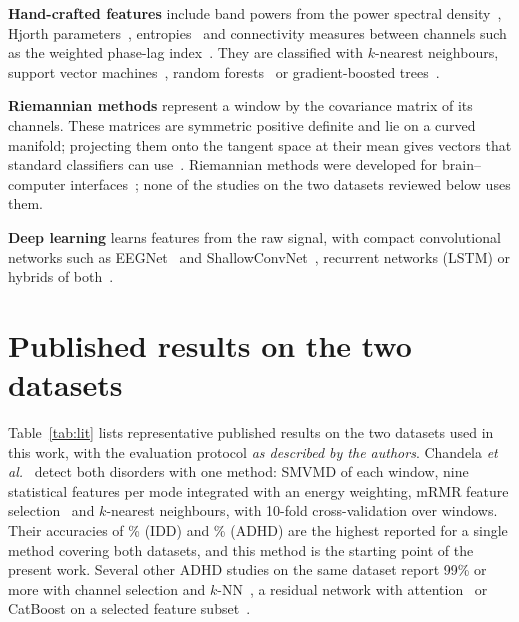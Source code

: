 \textbf{Hand-crafted features} include band powers from the power spectral
density~\cite{welch1967}, Hjorth parameters~\cite{hjorth1970}, entropies~\cite{richman2000,
bandt2002} and connectivity measures between channels such as the weighted phase-lag
index~\cite{vinck2011}. They are classified with $k$-nearest neighbours, support vector
machines~\cite{cortes1995}, random forests~\cite{breiman2001} or gradient-boosted
trees~\cite{chen2016, ke2017}.

\textbf{Riemannian methods} represent a window by the covariance matrix of its channels. These
matrices are symmetric positive definite and lie on a curved manifold; projecting them onto the
tangent space at their mean gives vectors that standard classifiers can
use~\cite{barachant2012, congedo2017}. Riemannian methods were developed for brain--computer
interfaces~\cite{congedo2017}; none of the studies on the two datasets reviewed below uses them.

\textbf{Deep learning} learns features from the raw signal, with compact convolutional networks
such as EEGNet~\cite{lawhern2018} and ShallowConvNet~\cite{schirrmeister2017}, recurrent networks
(LSTM) or hybrids of both~\cite{roy2019}.

\section{Published results on the two datasets}
Table~\ref{tab:lit} lists representative published results on the two datasets used in this
work, with the evaluation protocol \emph{as described by the authors}. Chandela
\emph{et al.}~\cite{chandela2025} detect both disorders with one method: SMVMD of each window,
nine statistical features per mode integrated with an energy weighting, mRMR feature
selection~\cite{peng2005} and $k$-nearest neighbours, with 10-fold cross-validation over windows.
Their accuracies of \% (IDD) and \% (ADHD) are the highest
reported for a single method covering both datasets, and this method is the starting point of the
present work. Several other ADHD studies on the same dataset report 99\% or more with channel
selection and $k$-NN~\cite{maheshwari2025}, a residual network with attention~\cite{bansal2025} or
CatBoost on a selected feature subset~\cite{mao2025}.

